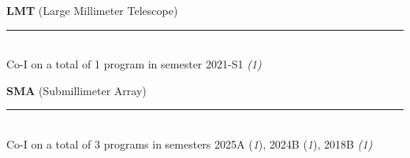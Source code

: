 \documentclass[11pt]{article}
\makeatletter
\def\vhrulefill#1{\leavevmode\leaders\hrule\@height#1\hfill \kern\z@}
\makeatother
\begin{document}

{\bf LMT} {\small (Large Millimeter Telescope)} \vhrulefill{0.5pt}\\
Co-I on a total of 1 program in semester 2021-S1 {\em(1)}\medskip



{\bf SMA} {\small (Submillimeter Array)} \vhrulefill{0.5pt}\\
Co-I on a total of 3 programs in semesters 2025A ({\em1}), 2024B ({\em1}), 2018B {\em(1)}\medskip
\end{document}
